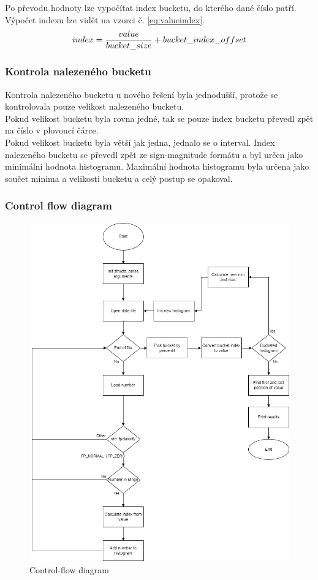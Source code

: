 \documentclass[12pt, a4paper]{article}
\begin{document}
\noindent Po převodu hodnoty lze vypočítat index bucketu, do kterého dané číslo patří. Výpočet indexu lze vidět na vzorci č. \ref{eq:valueindex}.
\begin{equation}
index = \frac{value}{bucket\_size} + bucket\_index\_offset  \\
\label{eq:valueindex} 
\end{equation}


\subsubsection{Kontrola nalezeného bucketu}
Kontrola nalezeného bucketu u nového řešení byla jednodušší, protože se kontrolovala pouze velikost nalezeného bucketu. \\
\indent Pokud velikost bucketu byla rovna jedné, tak se pouze index bucketu převedl zpět na číslo v plovoucí čárce.\\
\indent Pokud velikost bucketu byla větší jak jedna, jednalo se o interval. Index nalezeného bucketu se převedl zpět ze sign-magnitude formátu a byl určen jako minimální hodnota histogramu. Maximální hodnota histogramu byla určena jako součet minima a velikosti bucketu a celý postup se opakoval.

\newpage
\subsubsection{Control flow diagram}
\begin{figure}[!h]
\centering
\includegraphics[width=14cm]{img/control_flow}
\caption{Control-flow diagram}
\label{fig:controlflow}
\end{figure}
\newpage
\end{document}
